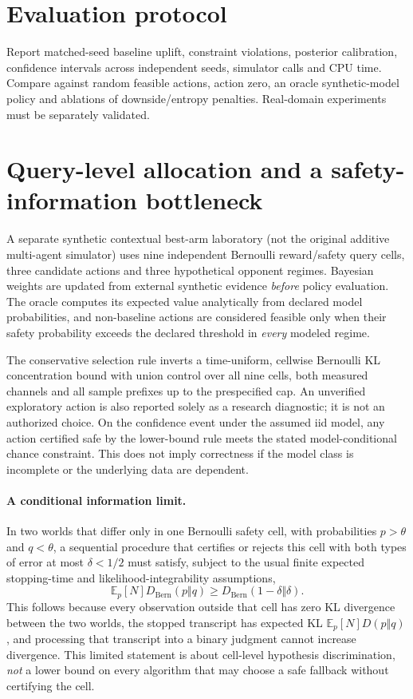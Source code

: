 \documentclass[11pt]{article}
\begin{document}
\section{Evaluation protocol}
Report matched-seed baseline uplift, constraint violations, posterior calibration, confidence intervals across independent seeds, simulator calls and CPU time. Compare against random feasible actions, action zero, an oracle synthetic-model policy and ablations of downside/entropy penalties. Real-domain experiments must be separately validated.
\section{Query-level allocation and a safety-information bottleneck}
A separate synthetic contextual best-arm laboratory (not the original additive multi-agent simulator) uses nine independent Bernoulli reward/safety query cells, three candidate actions and three hypothetical opponent regimes. Bayesian weights are updated from external synthetic evidence \emph{before} policy evaluation. The oracle computes its expected value analytically from declared model probabilities, and non-baseline actions are considered feasible only when their safety probability exceeds the declared threshold in \emph{every} modeled regime.

The conservative selection rule inverts a time-uniform, cellwise Bernoulli KL concentration bound with union control over all nine cells, both measured channels and all sample prefixes up to the prespecified cap. An unverified exploratory action is also reported solely as a research diagnostic; it is not an authorized choice. On the confidence event under the assumed iid model, any action certified safe by the lower-bound rule meets the stated model-conditional chance constraint. This does not imply correctness if the model class is incomplete or the underlying data are dependent.

\paragraph{A conditional information limit.}
In two worlds that differ only in one Bernoulli safety cell, with probabilities $p>\theta$ and $q<\theta$, a sequential procedure that certifies or rejects this cell with both types of error at most $\delta<1/2$ must satisfy, subject to the usual finite expected stopping-time and likelihood-integrability assumptions,
\[
 \mathbb E_p[N]D_{\mathrm{Bern}}(p\Vert q)\ge
 D_{\mathrm{Bern}}(1-\delta\Vert\delta).
\]
This follows because every observation outside that cell has zero KL divergence between the two worlds, the stopped transcript has expected KL $\mathbb E_p[N]D(p\Vert q)$, and processing that transcript into a binary judgment cannot increase divergence. This limited statement is about cell-level hypothesis discrimination, \emph{not} a lower bound on every algorithm that may choose a safe fallback without certifying the cell.
\end{document}
